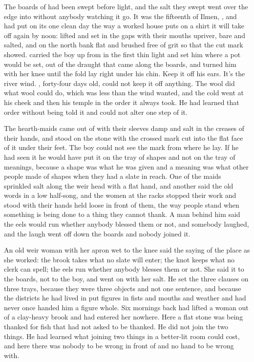 
The boards of  had been swept before light, and the salt they swept went over the edge into  without anybody watching it go. It was the fifteenth of Ilmen, , and  had put on its one clean day the way a worked house puts on a shirt it will take off again by noon:  lifted and set in the gaps with their mouths upriver,  bare and salted, and  on the north bank flat and brushed free of grit so that the cut mark showed.  carried the boy up from  in the first thin light and set him where a pot would be set, out of the draught that came along the boards, and turned him with her knee until the fold lay right under his chin. Keep it off his ears. It's the river wind. , forty-four days old, could not keep it off anything. The wool did what wool could do, which was less than the wind wanted, and the cold went at his cheek and then his temple in the order it always took. He had learned that order without being told it and could not alter one step of it.

The hearth-maids came out of  with their sleeves damp and salt in the creases of their hands, and stood on the stone with the crossed mark cut into the flat face of it under their feet. The boy could not see the mark from where he lay. If he had seen it he would have put it on the tray of shapes and not on the tray of meanings, because a shape was what he was given and a meaning was what other people made of shapes when they had a slate in reach. One of the maids sprinkled salt along the weir head with a flat hand, and another said the old words in a low half-song, and the women at the racks stopped their work and stood with their hands held loose in front of them, the way people stand when something is being done to a thing they cannot thank. A man behind him said the eels would run whether anybody blessed them or not, and somebody laughed, and the laugh went off down the boards and nobody joined it.

An old weir woman with her apron wet to the knee said the saying of the place as she worked: the brook takes what no slate will enter; the knot keeps what no clerk can spell; the eels run whether anybody blesses them or not. She said it to the boards, not to the boy, and went on with her salt. He set the three clauses on three trays, because they were three objects and not one sentence, and because the districts he had lived in put figures in fists and mouths and weather and had never once handed him a figure whole. Six mornings back  had lifted a woman out of a clay-heavy brook and had entered her nowhere. Here a flat stone was being thanked for fish that had not asked to be thanked. He did not join the two things. He had learned what joining two things in a better-lit room could cost, and here there was nobody to be wrong in front of and no hand to be wrong with.

